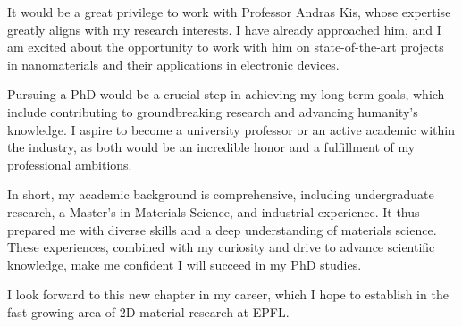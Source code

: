 \documentclass{article}
\begin{document}
It would be a great privilege to work with Professor Andras Kis, whose expertise greatly aligns with my research interests. I have already approached him, and I am excited about the opportunity to work with him on state-of-the-art projects in nanomaterials and their applications in electronic devices.

Pursuing a PhD would be a crucial step in achieving my long-term goals, which include contributing to groundbreaking research and advancing humanity's knowledge. I aspire to become a university professor or an active academic within the industry, as both would be an incredible honor and a fulfillment of my professional ambitions.

In short, my academic background is comprehensive, including undergraduate research, a Master's in Materials Science, and industrial experience. It thus prepared me with diverse skills and a deep understanding of materials science. These experiences, combined with my curiosity and drive to advance scientific knowledge, make me confident I will succeed in my PhD studies.

I look forward to this new chapter in my career, which I hope to establish in the fast-growing area of 2D material research at EPFL.
\vspace{0.125in}


\end{document}
